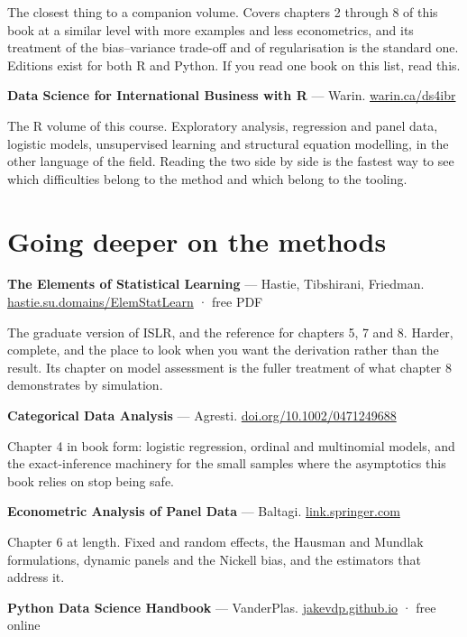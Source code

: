 \documentclass[
  letterpaper,
  10pt,
  twoside,
  openright,
  numbers=noenddot,
  chapterprefix=true]{scrbook}
\begin{document}
The closest thing to a companion volume. Covers chapters 2 through 8 of
this book at a similar level with more examples and less econometrics,
and its treatment of the bias--variance trade-off and of regularisation
is the standard one. Editions exist for both R and Python. If you read
one book on this list, read this.

\textbf{Data Science for International Business with R} --- Warin.
\href{https://warin.ca/ds4ibr/}{warin.ca/ds4ibr}

The R volume of this course. Exploratory analysis, regression and panel
data, logistic models, unsupervised learning and structural equation
modelling, in the other language of the field. Reading the two side by
side is the fastest way to see which difficulties belong to the method
and which belong to the tooling.

\section{Going deeper on the methods}\label{going-deeper-on-the-methods}

\textbf{The Elements of Statistical Learning} --- Hastie, Tibshirani,
Friedman.
\href{https://hastie.su.domains/ElemStatLearn/}{hastie.su.domains/ElemStatLearn}
· free PDF

The graduate version of ISLR, and the reference for chapters 5, 7 and 8.
Harder, complete, and the place to look when you want the derivation
rather than the result. Its chapter on model assessment is the fuller
treatment of what chapter 8 demonstrates by simulation.

\textbf{Categorical Data Analysis} --- Agresti.
\href{https://doi.org/10.1002/0471249688}{doi.org/10.1002/0471249688}

Chapter 4 in book form: logistic regression, ordinal and multinomial
models, and the exact-inference machinery for the small samples where
the asymptotics this book relies on stop being safe.

\textbf{Econometric Analysis of Panel Data} --- Baltagi.
\href{https://link.springer.com/book/10.1007/978-3-030-53953-5}{link.springer.com}

Chapter 6 at length. Fixed and random effects, the Hausman and Mundlak
formulations, dynamic panels and the Nickell bias, and the estimators
that address it.

\textbf{Python Data Science Handbook} --- VanderPlas.
\href{https://jakevdp.github.io/PythonDataScienceHandbook/}{jakevdp.github.io}
· free online
\end{document}
